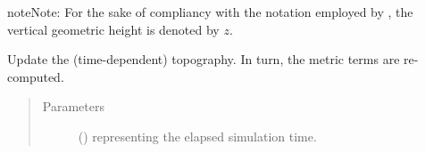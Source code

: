 \documentclass[letterpaper,10pt,english]{sphinxmanual}
\begin{document}
\begin{fulllineitems}
\begin{fulllineitems}
\begin{quote}
\begin{description}
\end{description}\end{quote}

\begin{sphinxadmonition}{note}{Note:}
For the sake of compliancy with the notation employed by ,
the vertical geometric height is denoted by \(z\).
\end{sphinxadmonition}

\end{fulllineitems}


\begin{fulllineitems}
\label{\detokenize{api:grids.gal_chen.GalChen2d.update_topography}}
Update the (time-dependent) topography. In turn, the metric terms are re-computed.
\begin{quote}\begin{description}
\item[{Parameters}] \leavevmode
{} () \textendash{}  representing the elapsed simulation time.

\end{description}\end{quote}

\end{fulllineitems}


\end{fulllineitems}

\end{document}
